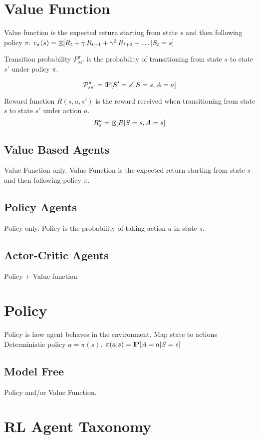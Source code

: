 \section{Value Function}
Value function is the expected return starting from state $s$ and then following policy $\pi$.
$v_{\pi}(s)=\mathop{\mathbb{E}}[R_t+\gamma\,R_{t+1}+\gamma^2\,R_{t+2}+\ldots|S_t=s]$

Transition probability $P_{ss'}^{\pi}$ is the probability of transitioning from state $s$ to state $s'$ under policy $\pi$.

\[
    \mathcal{P}_{ss'}^a=\text{I\kern-0.15em P}[S'=s'|S=s,A=a]
\]

Reward function $R(s,a,s')$ is the reward received when transitioning from state $s$ to state $s'$ under action $a$.
\[
    R_s^a=\mathop{\mathbb{E}}[R|S=s,A=s]
\]

\subsection{Value Based Agents}\label{subsec:value-based-agents}
Value Function only.
Value Function is the expected return starting from state $s$ and then following policy $\pi$.

\subsection{Policy Agents}\label{subsec:policy-agents}
Policy only.
Policy is the probability of taking action $a$ in state $s$.

\subsection{Actor-Critic Agents}\label{subsec:actor-critic-agents}
Policy + Value function


\section{Policy}
Policy is how agent behaves in the environment.
Map state to actions
Deterministic policy $a=\pi(s)$.
$\pi(a|s)=\text{I\kern-0.15em P}[A=a|S=s]$

\subsection{Model Free}
Policy and/or Value Function.


\section{RL Agent Taxonomy}


